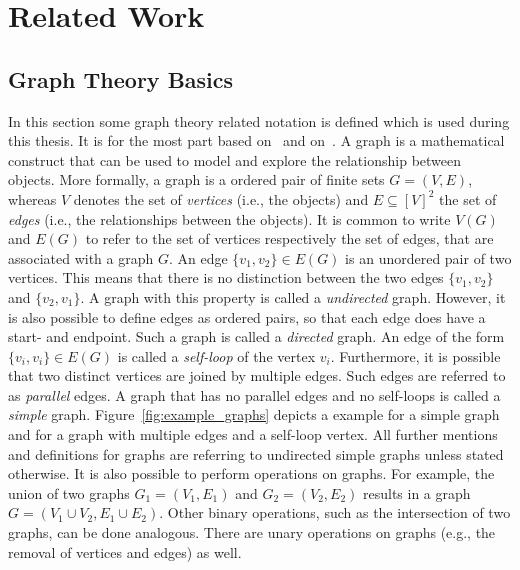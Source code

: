 \chapter{Related Work}


\section{Graph Theory Basics}
\label{sec:graph-theory-basics}

In this section some graph theory related notation is defined which is used during this thesis.
It is for the most part based on~\cite{Thulasiraman1992} and on~\cite{Diestel2012}.
A graph is a mathematical construct that can be used to model and explore the relationship between objects.
More formally, a graph is a ordered pair of finite sets \(G = (V, E)\), whereas \(V\) denotes the set of \emph{vertices} (i.e., the objects) and \(E \subseteq [V]^{2} \) the set of \emph{edges} (i.e., the relationships between the objects).
It is common to write \(V(G)\) and \(E(G)\) to refer to the set of vertices  respectively the set of edges, that are associated with a graph \(G\).
An edge \(\{v_1, v_2\} \in E(G)\) is an unordered pair of two vertices.
This means that there is no distinction between the two edges \(\{v_1, v_2 \}\) and \(\{v_2, v_1\}\).
A graph with this property is called a \emph{undirected} graph.
However, it is also possible to define edges as ordered pairs, so that each edge does have a start- and endpoint.
Such a graph is called a \emph{directed} graph.
An edge of the form \(\{v_i, v_i\} \in E(G)\) is called a \emph{self-loop} of the vertex \(v_i\).
Furthermore, it is possible that two distinct vertices are joined by multiple edges.
Such edges are referred to as \emph{parallel} edges.
A graph that has no parallel edges and no self-loops is called a \emph{simple} graph.
Figure~\ref{fig:example_graphs} depicts a example for a simple graph and for a graph with multiple edges and a self-loop vertex.
All further mentions and definitions for graphs are referring to undirected simple graphs unless stated otherwise.
It is also possible to perform operations on graphs.
For example, the union of two graphs \(G_{1} = (V_{1}, E_{1})\) and \(G_{2} = (V_{2}, E_{2})\) results in a graph \(G = (V_{1} \cup V_{2}, E_{1} \cup E_{2})\).
Other binary operations, such as the intersection of two graphs, can be done analogous.
There are unary operations on graphs (e.g., the removal of vertices and edges) as well.

